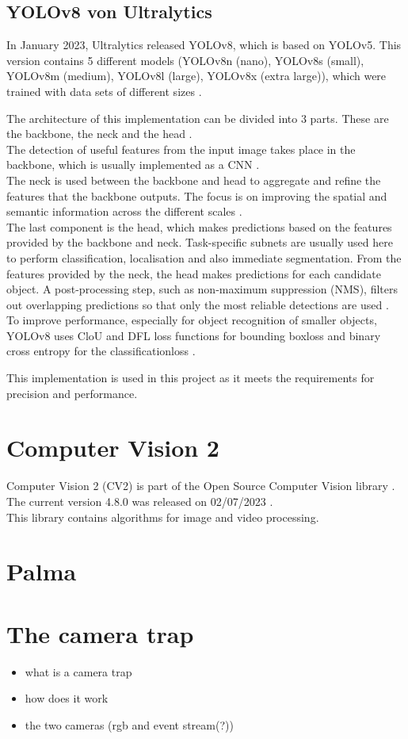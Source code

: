 	\subsection{YOLOv8 von Ultralytics}{ \label{subsec:YOLOv8_theoretic}
	
	In January 2023, Ultralytics released YOLOv8, which is based on YOLOv5. This version contains 5 different models (YOLOv8n (nano), YOLOv8s (small), YOLOv8m (medium), YOLOv8l (large), YOLOv8x (extra large)), which were trained with data sets of different sizes \citep{Terven2023}. 	

	The architecture of this implementation can be divided into 3 parts. These are the backbone, the neck and the head \citep{Terven2023}. \\
	The detection of useful features from the input image takes place in the backbone, which is usually implemented as a CNN \citep{Terven2023}. \\
	The neck is used between the backbone and head to aggregate and refine the features that the backbone outputs. The focus is on improving the spatial and semantic information across the different scales \citep{Terven2023}. \\
	The last component is the head, which makes predictions based on the features provided by the backbone and neck. Task-specific subnets are usually used here to perform classification, localisation and also immediate segmentation. From the features provided by the neck, the head makes predictions for each candidate object. A post-processing step, such as non-maximum suppression (NMS), filters out overlapping predictions so that only the most reliable detections are used \citep{Terven2023}.\\
	To improve performance, especially for object recognition of smaller objects, YOLOv8 uses CloU \citep{Zheng2020} and DFL \citep{Li2020} loss functions for bounding boxloss and binary cross entropy for the classificationloss \citep{Terven2023}. 

	This implementation is used in this project as it meets the requirements for precision and performance. 
	}


\section{Computer Vision 2}
		{ \label{subsec:Computer_Vision_2}
		Computer Vision 2 (CV2) is part of the \glqq Open Source Computer Vision\grqq{} library \citep{opencv_about}. The current version 4.8.0 was released on 02/07/2023 \citep{opencv_release}. \\
		This library contains algorithms for image and video processing. 
		}


\section{Palma}
		

\section{The camera trap}

\begin{itemize}
	\item what is a camera trap
	\item how does it work
	\item the two cameras (rgb and event stream(?))
\end{itemize}
